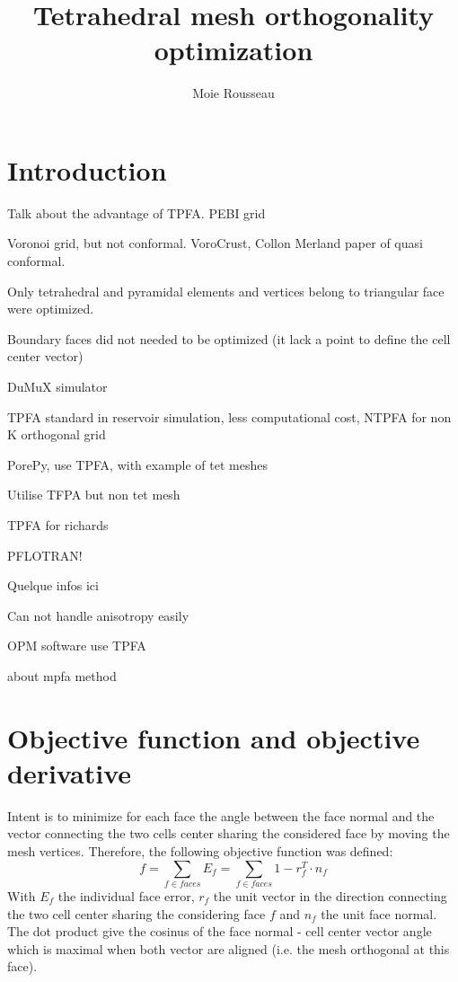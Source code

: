\documentclass[11pt]{article}
\title{\textbf{Tetrahedral mesh orthogonality optimization}}
\author{Moie Rousseau}
\date{}
\begin{document}
\maketitle
\thispagestyle{empty}

\section{Introduction}

Talk about the advantage of TPFA. PEBI grid

Voronoi grid, but not conformal. VoroCrust, Collon Merland paper of quasi conformal. 

Only tetrahedral and pyramidal elements and vertices belong to triangular face were optimized.

Boundary faces did not needed to be optimized (it lack a point to define the cell center vector)

DuMuX simulator %

TPFA standard in reservoir simulation, less computational cost, NTPFA for non K orthogonal grid %

PorePy, use TPFA, with example of tet meshes %

Utilise TFPA but non tet mesh %

TPFA for richards %

PFLOTRAN!

Quelque infos ici %

Can not handle anisotropy easily %

OPM software use TPFA %

about mpfa method %

\section{Objective function and objective derivative}

Intent is to minimize for each face the angle between the face normal and the vector connecting the two cells center sharing the considered face by moving the mesh vertices. Therefore, the following objective function was defined:
\begin{equation}
f = \sum_{f \in faces} E_f = \sum_{f \in faces} 1 - r_f^T \cdot n_f
\end{equation}
With $E_f$ the individual face error, $r_f$ the unit vector in the direction connecting the two cell center sharing the considering face $f$ and $n_f$ the unit face normal. The dot product give the cosinus of the face normal - cell center vector angle which is maximal when both vector are aligned (i.e. the mesh orthogonal at this face).
\end{document}
